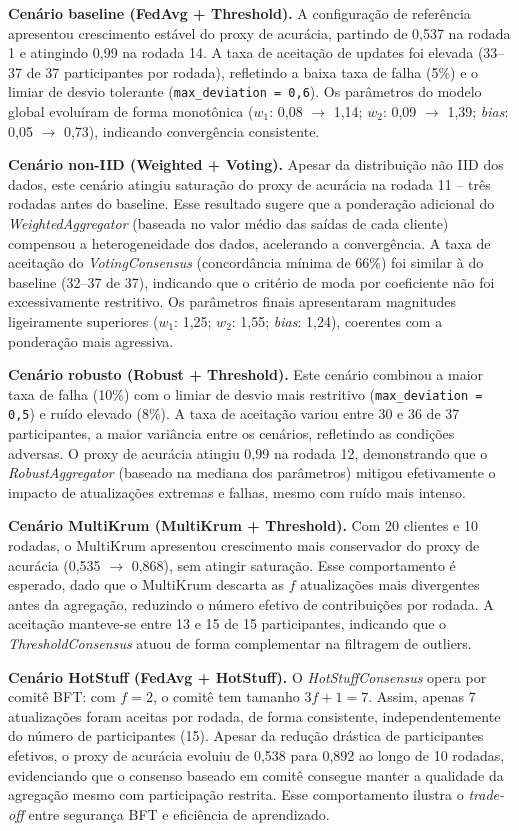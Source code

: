 \documentclass[12pt]{article}
\begin{document}
\textbf{Cenário baseline (FedAvg + Threshold).} A configuração de referência apresentou crescimento estável do proxy de acurácia, partindo de 0,537 na rodada 1 e atingindo 0,99 na rodada 14. A taxa de aceitação de updates foi elevada (33--37 de 37 participantes por rodada), refletindo a baixa taxa de falha (5\%) e o limiar de desvio tolerante (\texttt{max\_deviation = 0,6}). Os parâmetros do modelo global evoluíram de forma monotônica ($w_1$: 0,08 $\to$ 1,14; $w_2$: 0,09 $\to$ 1,39; \textit{bias}: 0,05 $\to$ 0,73), indicando convergência consistente.

\textbf{Cenário non-IID (Weighted + Voting).} Apesar da distribuição não IID dos dados, este cenário atingiu saturação do proxy de acurácia na rodada 11 -- três rodadas antes do baseline. Esse resultado sugere que a ponderação adicional do \textit{WeightedAggregator} (baseada no valor médio das saídas de cada cliente) compensou a heterogeneidade dos dados, acelerando a convergência. A taxa de aceitação do \textit{VotingConsensus} (concordância mínima de 66\%) foi similar à do baseline (32--37 de 37), indicando que o critério de moda por coeficiente não foi excessivamente restritivo. Os parâmetros finais apresentaram magnitudes ligeiramente superiores ($w_1$: 1,25; $w_2$: 1,55; \textit{bias}: 1,24), coerentes com a ponderação mais agressiva.

\textbf{Cenário robusto (Robust + Threshold).} Este cenário combinou a maior taxa de falha (10\%) com o limiar de desvio mais restritivo (\texttt{max\_deviation = 0,5}) e ruído elevado (8\%). A taxa de aceitação variou entre 30 e 36 de 37 participantes, a maior variância entre os cenários, refletindo as condições adversas. O proxy de acurácia atingiu 0,99 na rodada 12, demonstrando que o \textit{RobustAggregator} (baseado na mediana dos parâmetros) mitigou efetivamente o impacto de atualizações extremas e falhas, mesmo com ruído mais intenso.

\textbf{Cenário MultiKrum (MultiKrum + Threshold).} Com 20 clientes e 10 rodadas, o MultiKrum apresentou crescimento mais conservador do proxy de acurácia (0,535 $\to$ 0,868), sem atingir saturação. Esse comportamento é esperado, dado que o MultiKrum descarta as $f$ atualizações mais divergentes antes da agregação, reduzindo o número efetivo de contribuições por rodada. A aceitação manteve-se entre 13 e 15 de 15 participantes, indicando que o \textit{ThresholdConsensus} atuou de forma complementar na filtragem de outliers.

\textbf{Cenário HotStuff (FedAvg + HotStuff).} O \textit{HotStuffConsensus} opera por comitê BFT: com $f = 2$, o comitê tem tamanho $3f + 1 = 7$. Assim, apenas 7 atualizações foram aceitas por rodada, de forma consistente, independentemente do número de participantes (15). Apesar da redução drástica de participantes efetivos, o proxy de acurácia evoluiu de 0,538 para 0,892 ao longo de 10 rodadas, evidenciando que o consenso baseado em comitê consegue manter a qualidade da agregação mesmo com participação restrita. Esse comportamento ilustra o \textit{trade-off} entre segurança BFT e eficiência de aprendizado.
\end{document}
